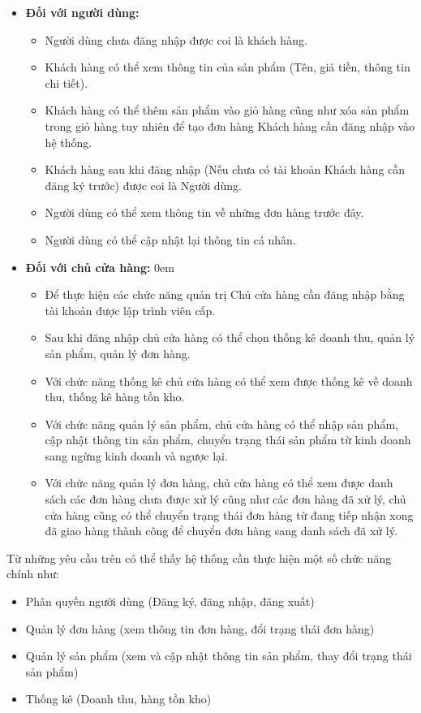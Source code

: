\begin{itemize}
\itemsep0em
\item \textbf{Đối với người dùng:}
    \begin{itemize}
    \item Người dùng chưa đăng nhập được coi là khách hàng.
    \item Khách hàng có thể xem thông tin của sản phẩm (Tên, giá tiền, thông tin chi tiết).
    \item Khách hàng có thể thêm sản phẩm vào giỏ hàng cũng như xóa sản phẩm trong giỏ hàng tuy nhiên để tạo đơn hàng Khách hàng cần đăng nhập vào hệ thống.
    \item Khách hàng sau khi đăng nhập (Nếu chưa có tài khoản Khách hàng cần đăng ký trước) được coi là Người dùng.
    \item Người dùng có thể xem thông tin về những đơn hàng trước đây.
    \item Người dùng có thể cập nhật lại thông tin cá nhân.
    \end{itemize}
\vspace{1em}
\item \textbf{Đối với chủ cửa hàng:}
\itemsep0em
    \begin{itemize}
    \item Để thực hiện các chức năng quản trị Chủ cửa hàng cần đăng nhập bằng tài khoản được lập trình viên cấp.
    \item Sau khi đăng nhập chủ cửa hàng có thể chọn thống kê doanh thu, quản lý sản phẩm, quản lý đơn hàng.
    \item Với chức năng thống kê chủ cửa hàng có thể xem được thống kê về doanh thu, thống kê hàng tồn kho.
    \item Với chức năng quản lý sản phẩm, chủ cửa hàng có thể nhập sản phẩm, cập nhật thông tin sản phẩm, chuyển trạng thái sản phẩm từ kinh doanh sang ngừng kinh doanh và ngược lại.
    \item Với chức năng quản lý đơn hàng, chủ cửa hàng có thể xem được danh sách các đơn hàng chưa được xử lý cũng như các đơn hàng đã xử lý, chủ cửa hàng cũng có thể chuyển trạng thái đơn hàng từ đang tiếp nhận xong đã giao hàng thành công để chuyển đơn hàng sang danh sách đã xử lý.

    \end{itemize}
\end{itemize}

Từ những yêu cầu trên có thể thấy hệ thống cần thực hiện một số chức năng chính như:
\begin{itemize}
\itemsep0em
\item Phân quyền người dùng (Đăng ký, đăng nhập, đăng xuất)
\item Quản lý đơn hàng (xem thông tin đơn hàng, đổi trạng thái đơn hàng)
\item Quản lý sản phẩm (xem và cập nhật thông tin sản phẩm, thay đổi trạng thái sản phẩm)
\item Thống kê (Doanh thu, hàng tồn kho)
\end{itemize}

